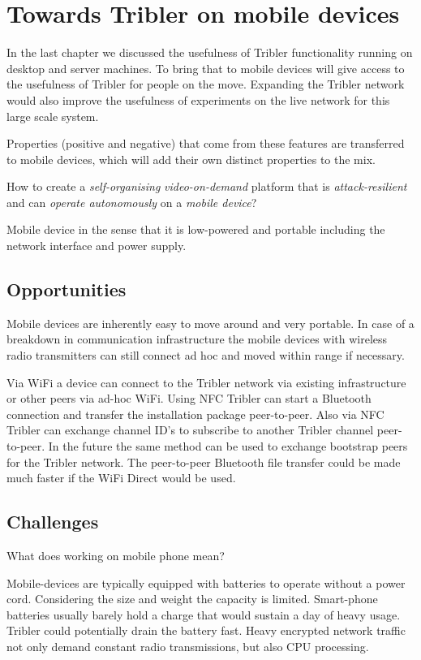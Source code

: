 \chapter{Towards Tribler on mobile devices}

In the last chapter we discussed the usefulness of Tribler functionality running on desktop and server machines.
To bring that to mobile devices will give access to the usefulness of Tribler for people on the move.
Expanding the Tribler network would also improve the usefulness of experiments on the live network for this large scale system.

Properties (positive and negative) that come from these features are transferred to mobile devices, which will add their own distinct properties to the mix.


How to create a \emph{self-organising} \emph{video-on-demand} platform that is \emph{attack-resilient} and can \emph{operate autonomously} on a \emph{mobile device}?

Mobile device in the sense that it is low-powered and portable including the network interface and power supply.



\section{Opportunities}

Mobile devices are inherently easy to move around and very portable.
In case of a breakdown in communication infrastructure the mobile devices with wireless radio transmitters can still connect ad hoc and moved within range if necessary.

Via WiFi a device can connect to the Tribler network via existing infrastructure or other peers via ad-hoc WiFi.
Using NFC Tribler can start a Bluetooth connection and transfer the installation package peer-to-peer.
Also via NFC Tribler can exchange channel ID's to subscribe to another Tribler channel peer-to-peer.
In the future the same method can be used to exchange bootstrap peers for the Tribler network.
The peer-to-peer Bluetooth file transfer could be made much faster if the WiFi Direct would be used.


\section{Challenges}

What does working on mobile phone mean?

Mobile-devices are typically equipped with batteries to operate without a power cord.
Considering the size and weight the capacity is limited.
Smart-phone batteries usually barely hold a charge that would sustain a day of heavy usage.
Tribler could potentially drain the battery fast.
Heavy encrypted network traffic not only demand constant radio transmissions, but also CPU processing.
